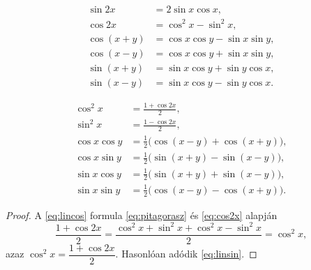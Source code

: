 \documentclass[11pt]{article}
\begin{document}
\begin{thmbox}
\begin{theorem}
\begin{align}
\sin 2x&=2\sin x\cos x, \label{eq:sin2x}\\
\cos 2x&=\cos^{2}x-\sin^{2}x, \label{eq:cos2x}\\
\cos(x+y)&=\cos x\cos y-\sin x\sin y,\\
\cos(x-y)&=\cos x\cos y+\sin x\sin y,\\
\sin(x+y)&=\sin x\cos y+\sin y\cos x,\\
\sin(x-y)&=\sin x\cos y-\sin y\cos x .
\end{align}
\end{theorem}
\end{thmbox}

\begin{thmbox}
\begin{theorem}
\begin{align}
\cos^{2}x&=\frac{1+\cos 2x}{2}, \label{eq:lincos}\\
\sin^{2}x&=\frac{1-\cos 2x}{2}, \label{eq:linsin}\\
\cos x\cos y&=\frac{1}{2}\bigl(\cos(x-y)+\cos(x+y)\bigr),\\
\cos x\sin y&=\frac{1}{2}\bigl(\sin(x+y)-\sin(x-y)\bigr),\\
\sin x\cos y&=\frac{1}{2}\bigl(\sin(x+y)+\sin(x-y)\bigr),\\
\sin x\sin y&=\frac{1}{2}\bigl(\cos(x-y)-\cos(x+y)\bigr).
\end{align}
\end{theorem}
\end{thmbox}
\begin{proof}
A \eqref{eq:lincos} formula \eqref{eq:pitagorasz} és \eqref{eq:cos2x} alapján
\[
\frac{1+\cos 2x}{2}=\frac{\cos^{2}x+\sin^{2}x+\cos^{2}x-\sin^{2}x}{2}=\cos^{2}x,
\]
azaz $\cos^{2}x=\dfrac{1+\cos 2x}{2}$. Hasonlóan adódik \eqref{eq:linsin}.
\end{proof}
\end{document}
